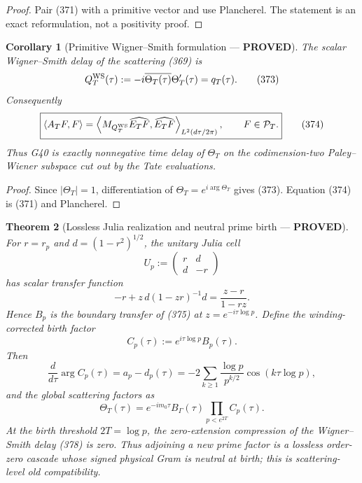 \documentclass[11pt]{article}
\newtheorem{theorem}{Theorem}
\newtheorem{corollary}[theorem]{Corollary}
\newcommand{\PROVED}{\textcolor{green!45!black}{\textbf{PROVED}}}
\begin{document}
\begin{proof}
Pair (371) with a primitive vector and use Plancherel.  The statement is an
exact reformulation, not a positivity proof.
\end{proof}

\begin{corollary}[Primitive Wigner--Smith formulation --- \PROVED]
The scalar Wigner--Smith delay of the scattering (369) is
\begin{equation}
 Q_T^{\rm WS}(\tau)
 :=-i\overline{\Theta_T(\tau)}\Theta_T'(\tau)
 =q_T(\tau).                                         \tag{373}
\end{equation}
Consequently
\begin{equation}
 \boxed{
 \langle A_TF,F\rangle
 =\left\langle
 M_{Q_T^{\rm WS}}\widehat{E_TF},
 \widehat{E_TF}\right\rangle_{L^2(d\tau/2\pi)},
 \qquad F\in\mathcal P_T.}                          \tag{374}
\end{equation}
Thus G40 is exactly nonnegative time delay of $\Theta_T$ on the
codimension-two Paley--Wiener subspace cut out by the Tate evaluations.
\end{corollary}

\begin{proof}
Since $|\Theta_T|=1$, differentiation of
$\Theta_T=e^{i\arg\Theta_T}$ gives (373).  Equation (374) is (371) and
Plancherel.
\end{proof}

\begin{theorem}[Lossless Julia realization and neutral prime birth ---
\PROVED]
For $r=r_p$ and $d=(1-r^2)^{1/2}$, the unitary Julia cell
\begin{equation}
 U_p:=\begin{pmatrix}r&d\\d&-r\end{pmatrix}          \tag{375}
\end{equation}
has scalar transfer function
\begin{equation}
 -r+z\,d(1-zr)^{-1}d
 =\frac{z-r}{1-rz}.                                  \tag{376}
\end{equation}
Hence $B_p$ is the boundary transfer of (375) at
$z=e^{-i\tau\log p}$.  Define the winding-corrected birth factor
\begin{equation}
 C_p(\tau):=e^{i\tau\log p}B_p(\tau).               \tag{377}
\end{equation}
Then
\begin{equation}
 \frac d{d\tau}\arg C_p(\tau)
 =a_p-d_p(\tau)
 =-2\sum_{k\ge1}\frac{\log p}{p^{k/2}}
                    \cos(k\tau\log p),             \tag{378}
\end{equation}
and the global scattering factors as
\begin{equation}
 \boxed{
 \Theta_T(\tau)=e^{-im_0\tau}B_\Gamma(\tau)
       \prod_{p<e^{2T}}C_p(\tau).}                  \tag{379}
\end{equation}
At the birth threshold $2T=\log p$, the zero-extension compression of the
Wigner--Smith delay (378) is zero.  Thus adjoining a new prime factor is a
lossless order-zero cascade whose signed physical Gram is neutral at birth;
this is scattering-level old compatibility.
\end{theorem}
\end{document}
